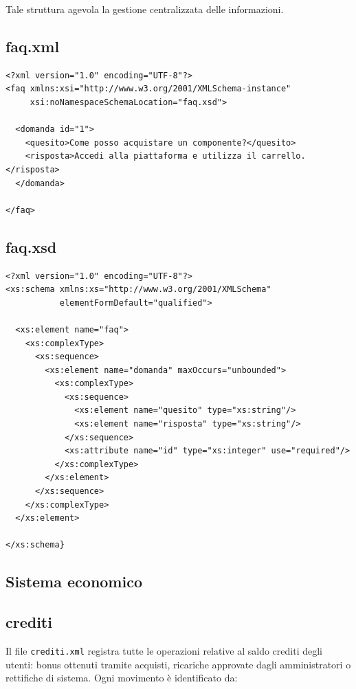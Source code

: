 \documentclass[a4paper,12pt]{report}
\begin{document}
Tale struttura agevola la gestione centralizzata delle informazioni.

\subsection*{faq.xml}
{\footnotesize
\begin{lstlisting}
<?xml version="1.0" encoding="UTF-8"?>
<faq xmlns:xsi="http://www.w3.org/2001/XMLSchema-instance"
     xsi:noNamespaceSchemaLocation="faq.xsd">

  <domanda id="1">
    <quesito>Come posso acquistare un componente?</quesito>
    <risposta>Accedi alla piattaforma e utilizza il carrello.</risposta>
  </domanda>

</faq>
\end{lstlisting}}

\subsection*{faq.xsd}
{\footnotesize
\begin{lstlisting}
<?xml version="1.0" encoding="UTF-8"?>
<xs:schema xmlns:xs="http://www.w3.org/2001/XMLSchema"
           elementFormDefault="qualified">

  <xs:element name="faq">
    <xs:complexType>
      <xs:sequence>
        <xs:element name="domanda" maxOccurs="unbounded">
          <xs:complexType>
            <xs:sequence>
              <xs:element name="quesito" type="xs:string"/>
              <xs:element name="risposta" type="xs:string"/>
            </xs:sequence>
            <xs:attribute name="id" type="xs:integer" use="required"/>
          </xs:complexType>
        </xs:element>
      </xs:sequence>
    </xs:complexType>
  </xs:element>

</xs:schema}
\end{lstlisting}
}


\subsection{Sistema economico}
\label{sec:xml-economia}
\subsection*{crediti}


Il file \texttt{crediti.xml} registra tutte le operazioni relative al saldo crediti
degli utenti: bonus ottenuti tramite acquisti, ricariche approvate dagli amministratori
o rettifiche di sistema.  
Ogni movimento è identificato da:
\end{document}
